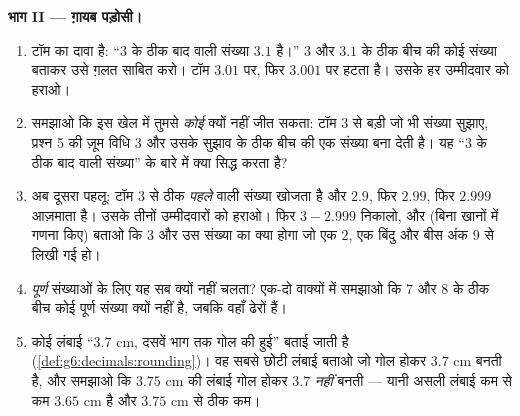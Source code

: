 \begin{problem}
\medskip
\noindent\textbf{भाग II --- ग़ायब पड़ोसी।}
\begin{enumerate}[resume]
  \item टॉम का दावा है: ``$3$ के ठीक बाद वाली संख्या $3.1$ है।''
        $3$ और $3.1$ के ठीक बीच की कोई संख्या बताकर उसे ग़लत
        साबित करो। टॉम $3.01$ पर, फिर $3.001$ पर हटता है। उसके
        हर उम्मीदवार को हराओ।
  \item समझाओ कि इस खेल में तुमसे \emph{कोई} क्यों नहीं जीत
        सकता: टॉम $3$ से बड़ी जो भी संख्या सुझाए, प्रश्न 5 की
        ज़ूम विधि $3$ और उसके सुझाव के ठीक बीच की एक संख्या बना
        देती है। यह ``$3$ के ठीक बाद वाली संख्या'' के बारे में
        क्या सिद्ध करता है?
  \item अब दूसरा पहलू: टॉम $3$ से ठीक \emph{पहले} वाली संख्या
        खोजता है और $2.9$, फिर $2.99$, फिर $2.999$ आज़माता है।
        उसके तीनों उम्मीदवारों को हराओ। फिर $3 - 2.999$ निकालो,
        और (बिना खानों में गणना किए) बताओ कि $3$ और उस संख्या का
         क्या होगा जो एक $2$, एक बिंदु और बीस अंक $9$ से
        लिखी गई हो।
  \item \emph{पूर्ण} संख्याओं के लिए यह सब क्यों नहीं चलता?
        एक-दो वाक्यों में समझाओ कि $7$ और $8$ के ठीक बीच कोई
        पूर्ण संख्या क्यों नहीं है, जबकि वहाँ ढेरों  हैं।
  \item कोई लंबाई ``$3.7$ cm, दसवें भाग तक गोल की हुई''
        बताई जाती है (\cref{def:g6:decimals:rounding})। वह सबसे
        छोटी लंबाई बताओ जो गोल होकर $3.7$ cm बनती है, और समझाओ
        कि $3.75$ cm की लंबाई गोल होकर $3.7$ \emph{नहीं} बनती
        --- यानी असली लंबाई कम से कम $3.65$ cm है और $3.75$ cm
        से ठीक कम।
\end{enumerate}


\end{problem}
